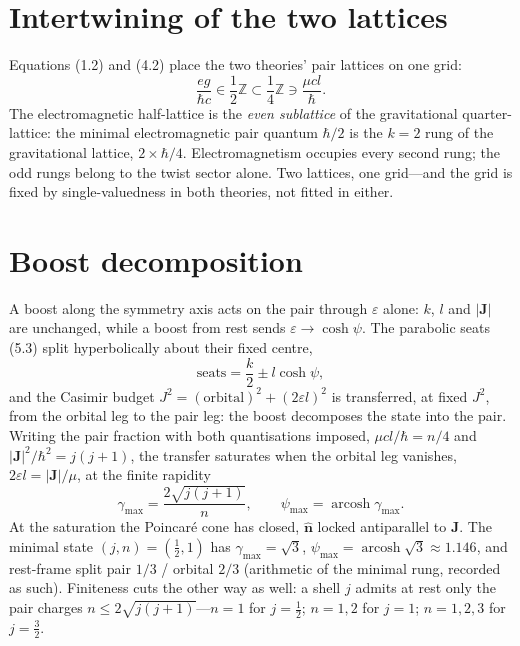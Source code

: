 \documentclass[11pt]{article}
\numberwithin{equation}{section}
\newcommand{\eps}{\varepsilon}
\newcommand{\ZZ}{\mathbb{Z}}
\begin{document}
\section{Intertwining of the two lattices}

Equations (1.2) and (4.2) place the two theories' pair lattices on one
grid:
\begin{equation}
\frac{eg}{\hbar c}\in\frac12\ZZ\subset\frac14\ZZ\ni\frac{\mu c l}{\hbar}.
\end{equation}
The electromagnetic half-lattice is the \emph{even sublattice} of the
gravitational quarter-lattice: the minimal electromagnetic pair quantum
$\hbar/2$ is the $k=2$ rung of the gravitational lattice, $2\times\hbar/4$.
Electromagnetism occupies every second rung; the odd rungs belong to the
twist sector alone. Two lattices, one grid---and the grid is fixed by
single-valuedness in both theories, not fitted in either.

\section{Boost decomposition}

A boost along the symmetry axis acts on the pair through $\eps$ alone:
$k$, $l$ and $|\mathbf{J}|$ are unchanged, while a boost from rest sends
$\eps\to\cosh\psi$. The parabolic seats (5.3) split hyperbolically about
their fixed centre,
\begin{equation}
\text{seats}=\frac{k}{2}\pm l\cosh\psi ,
\end{equation}
and the Casimir budget $J^2=(\text{orbital})^2+(2\eps l)^2$ is
transferred, at fixed $J^2$, from the orbital leg to the pair leg: the
boost decomposes the state into the pair. Writing the pair fraction with
both quantisations imposed, $\mu c l/\hbar=n/4$ and
$|\mathbf{J}|^2/\hbar^2=j(j+1)$, the transfer saturates when the orbital
leg vanishes, $2\eps l=|\mathbf{J}|/\mu$, at the finite rapidity
\begin{equation}
\gamma_{\max}=\frac{2\sqrt{j(j+1)}}{n},
\qquad
\psi_{\max}=\operatorname{arcosh}\gamma_{\max}.
\end{equation}
At the saturation the Poincar\'e cone has closed,
$\hat{\mathbf{n}}$ locked antiparallel to $\mathbf{J}$. The minimal state
$(j,n)=(\tfrac12,1)$ has $\gamma_{\max}=\sqrt3$,
$\psi_{\max}=\operatorname{arcosh}\sqrt3\approx1.146$, and rest-frame split
pair $1/3$ / orbital $2/3$ (arithmetic of the minimal rung, recorded as
such). Finiteness cuts the other way as well: a shell $j$ admits at rest
only the pair charges $n\le2\sqrt{j(j+1)}$---$n=1$ for $j=\tfrac12$;
$n=1,2$ for $j=1$; $n=1,2,3$ for $j=\tfrac32$.
\end{document}

